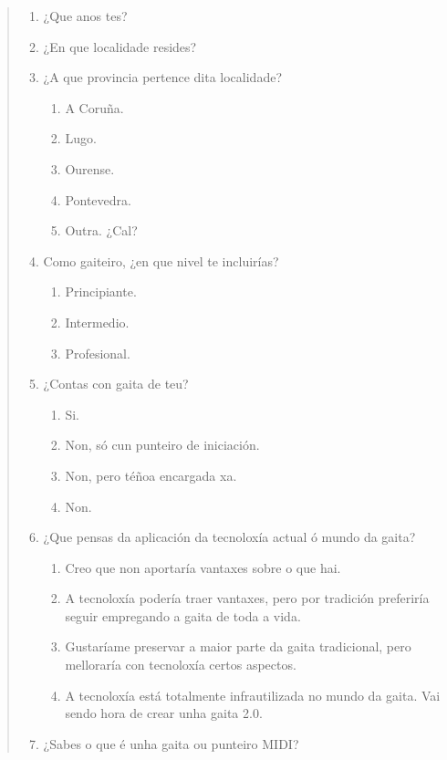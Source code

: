 \begin{quotation}
 \begin{enumerate}
  \item ¿Que anos tes?
  \item ¿En que localidade resides?
  \item ¿A que provincia pertence dita localidade?
        \begin{enumerate}
         \item A Coruña.
         \item Lugo.
         \item Ourense.
         \item Pontevedra.
         \item Outra. ¿Cal?
        \end{enumerate}
  \item Como gaiteiro, ¿en que nivel te incluirías?
        \begin{enumerate}
         \item Principiante.
         \item Intermedio.
         \item Profesional.
        \end{enumerate}
  \item ¿Contas con gaita de teu?
        \begin{enumerate}
         \item Si.
         \item Non, só cun punteiro de iniciación.
         \item Non, pero téñoa encargada xa.
         \item Non.
        \end{enumerate}
  \item ¿Que pensas da aplicación da tecnoloxía actual ó mundo da gaita?
        \begin{enumerate}
         \item Creo que non aportaría vantaxes sobre o que hai.
         \item A tecnoloxía podería traer vantaxes, pero por tradición
               preferiría seguir empregando a gaita de toda a vida.
         \item Gustaríame preservar a maior parte da gaita tradicional, pero
               melloraría con tecnoloxía certos aspectos.
         \item A tecnoloxía está totalmente infrautilizada no mundo da gaita.
               Vai sendo hora de crear unha gaita 2.0.
        \end{enumerate}
  \item ¿Sabes o que é unha gaita ou punteiro MIDI?

\end{enumerate}
\end{quotation}
